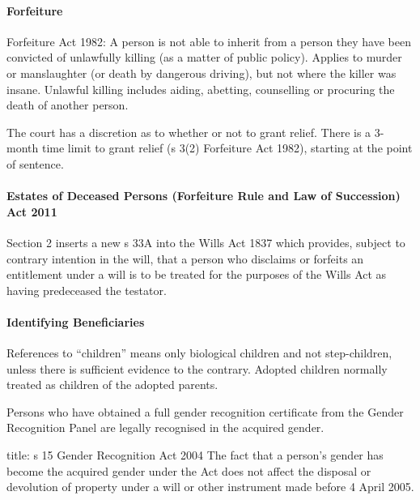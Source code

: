 \documentclass[
]{article}
\newenvironment{Shaded}{}{}
\newcommand{\NormalTok}[1]{#1}
\begin{document}
\hypertarget{forfeiture}{%
\paragraph{Forfeiture}\label{forfeiture}}

Forfeiture Act 1982: A person is not able to inherit from a person they
have been convicted of unlawfully killing (as a matter of public
policy). Applies to murder or manslaughter (or death by dangerous
driving), but not where the killer was insane. Unlawful killing includes
aiding, abetting, counselling or procuring the death of another person.

The court has a discretion as to whether or not to grant relief. There
is a 3-month time limit to grant relief (s 3(2) Forfeiture Act 1982),
starting at the point of sentence.

\hypertarget{estates-of-deceased-persons-forfeiture-rule-and-law-of-succession-act-2011}{%
\paragraph{Estates of Deceased Persons (Forfeiture Rule and Law of
Succession) Act
2011}\label{estates-of-deceased-persons-forfeiture-rule-and-law-of-succession-act-2011}}

Section 2 inserts a new s 33A into the Wills Act 1837 which provides,
subject to contrary intention in the will, that a person who disclaims
or forfeits an entitlement under a will is to be treated for the
purposes of the Wills Act as having predeceased the testator.

\hypertarget{identifying-beneficiaries}{%
\paragraph{Identifying Beneficiaries}\label{identifying-beneficiaries}}

References to ``children'' means only biological children and not
step-children, unless there is sufficient evidence to the contrary.
Adopted children normally treated as children of the adopted parents.

Persons who have obtained a full gender recognition certificate from the
Gender Recognition Panel are legally recognised in the acquired gender.

\begin{Shaded}
\begin{Highlighting}[]
\NormalTok{title: s 15 Gender Recognition Act 2004 }
\NormalTok{The fact that a person’s gender has become the acquired gender under the Act does not affect the disposal or devolution of property under a will or other instrument made before 4 April 2005.}
\end{Highlighting}
\end{Shaded}
\end{document}
